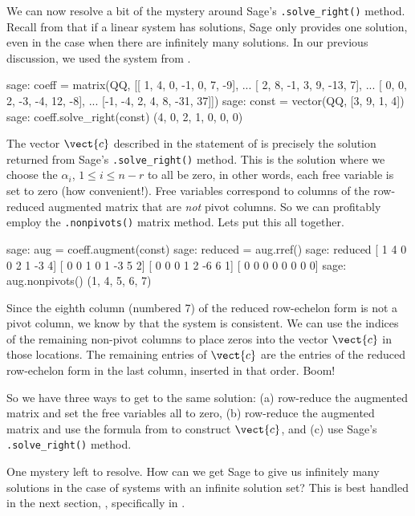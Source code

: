 We can now resolve a bit of the mystery around Sage's \verb?.solve_right()? method.  Recall from  that if a linear system has solutions, Sage only provides one solution, even in the case when there are infinitely many solutions.  In our previous discussion, we used the system from .
%
\begin{sageexample}
sage: coeff = matrix(QQ, [[ 1,  4,  0, -1,  0,   7, -9],
...                       [ 2,  8, -1,  3,  9, -13,  7],
...                       [ 0,  0,  2, -3, -4,  12, -8],
...                       [-1, -4,  2,  4,  8, -31, 37]])
sage: const = vector(QQ, [3, 9, 1, 4])
sage: coeff.solve_right(const)
(4, 0, 2, 1, 0, 0, 0)
\end{sageexample}
%
The vector $\vect{c}$ described in the statement of  is precisely the solution returned from Sage's \verb?.solve_right()? method.  This is the solution where we choose the $\alpha_i$, $1\leq i\leq n-r$ to all be zero, in other words, each free variable is set to zero (how convenient!).  Free variables correspond to columns of the row-reduced augmented matrix that are \emph{not} pivot columns.  So we can profitably employ the \verb?.nonpivots()? matrix method.  Lets put this all together.
%
\begin{sageexample}
sage: aug = coeff.augment(const)
sage: reduced = aug.rref()
sage: reduced
[ 1  4  0  0  2  1 -3  4]
[ 0  0  1  0  1 -3  5  2]
[ 0  0  0  1  2 -6  6  1]
[ 0  0  0  0  0  0  0  0]
sage: aug.nonpivots()
(1, 4, 5, 6, 7)
\end{sageexample}
%
Since the eighth column (numbered 7) of the reduced row-echelon form is not a pivot column, we know by  that the system is consistent.  We can use the indices of the remaining non-pivot columns to place zeros into the vector $\vect{c}$ in those locations.  The remaining entries of $\vect{c}$ are the entries of the reduced row-echelon form in the last column, inserted in that order.  Boom!\par
%
So we have three ways to get to the same solution: (a) row-reduce the augmented matrix and set the free variables all to zero, (b) row-reduce the augmented matrix and use the formula from  to construct $\vect{c}$, and (c) use Sage's \verb?.solve_right()? method.\par
%
One mystery left to resolve.  How can we get Sage to give us infinitely many solutions in the case of systems with an infinite solution set?  This is best handled in the next section, , specifically in .
%
\begin{sageverbatim}
\end{sageverbatim}
%
